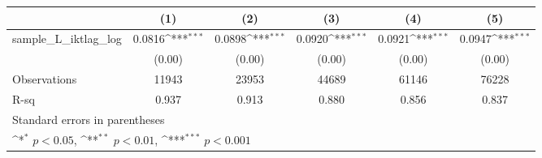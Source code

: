 {
\def\sym#1{\ifmmode^{#1}\else\(^{#1}\)\fi}
\begin{tabular}{l*{5}{c}}
\hline\hline
          &\multicolumn{1}{c}{(1)}         &\multicolumn{1}{c}{(2)}         &\multicolumn{1}{c}{(3)}         &\multicolumn{1}{c}{(4)}         &\multicolumn{1}{c}{(5)}         \\
\hline
sample\_L\_iktlag\_log&   0.0816\sym{***}&   0.0898\sym{***}&   0.0920\sym{***}&   0.0921\sym{***}&   0.0947\sym{***}\\
          &   (0.00)         &   (0.00)         &   (0.00)         &   (0.00)         &   (0.00)         \\
\hline
Observations&    11943         &    23953         &    44689         &    61146         &    76228         \\
R-sq      &    0.937         &    0.913         &    0.880         &    0.856         &    0.837         \\
\hline\hline
\multicolumn{6}{l}{\footnotesize Standard errors in parentheses}\\
\multicolumn{6}{l}{\footnotesize \sym{*} \(p<0.05\), \sym{**} \(p<0.01\), \sym{***} \(p<0.001\)}\\
\end{tabular}
}
